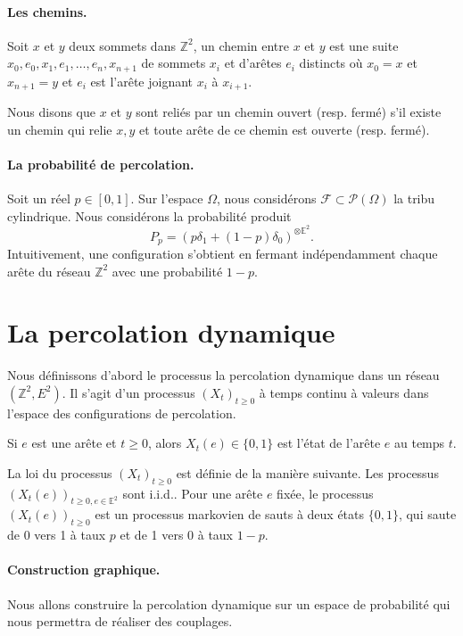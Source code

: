 \documentclass[titlepage,a4paper,12pt]{article}
\begin{document}
\paragraph{Les chemins.} Soit $x$ et $y$ deux sommets dans $\mathbb{Z}^2$, un chemin entre $x$ et $y$ est une suite $x_0,e_0, x_1,e_1,\dots, e_n,x_{n+1}$ de sommets $x_i$ et d'arêtes $e_i$ distincts où $x_0=x$ et $x_{n+1}=y$ et $e_i$ est l'arête joignant $x_i$ à $x_{i+1}$. 

Nous disons que $x$ et $y$ sont reliés par un chemin ouvert (resp. fermé) s'il existe un chemin qui relie $x,y$ et toute arête de ce chemin est ouverte (resp. fermé).

\paragraph{La probabilité de percolation.} Soit un réel $p\in [0,1]$. Sur l'espace $\Omega$, nous considérons $\mathcal{F}\subset \mathcal{P}(\Omega)$ la tribu cylindrique. Nous considérons la probabilité produit $$P_p = (p\delta_1 +(1-p)\delta_0)^{\otimes\mathbb{E}^2}.$$ Intuitivement, une configuration s'obtient en fermant indépendamment chaque arête du réseau $\mathbb{Z}^2$ avec une probabilité $1-p$. 

\section{La percolation dynamique}
Nous définissons d'abord le processus la percolation dynamique dans un réseau $(\mathbb{Z}^2,E^2)$. 
Il s'agit d'un processus $(X_t)_{t\geqslant 0}$ à temps continu à valeurs dans l'espace des configurations de percolation. 

Si $e$ est une arête et $t\geqslant 0$, alors $X_t(e)\in \{0,1\}$ est l'état de l'arête $e$ au temps $t$.

La loi du processus $(X_t)_{t\geqslant 0}$ est définie de la manière suivante. Les processus $(X_t(e))_{t\geqslant 0,e\in\mathbb{E}^2}$ sont i.i.d.. Pour une arête $e$ fixée, le processus $(X_t(e))_{t\geqslant 0}$ est un processus markovien de sauts à deux états $\{0,1\}$, qui saute de 0 vers 1 à taux $p$ et de 1 vers 0 à taux $1-p$.

\paragraph{Construction graphique.} Nous allons construire la percolation dynamique sur un espace de probabilité qui nous permettra de réaliser des couplages.
\end{document}
